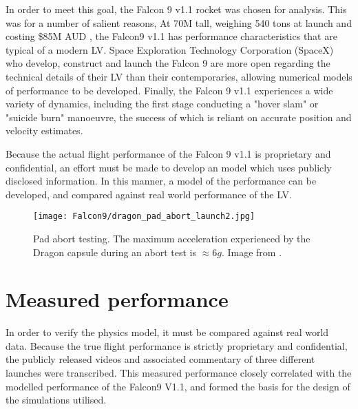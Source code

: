 In order to meet this goal, the Falcon 9 v1.1 rocket was chosen for analysis. This was for a number of salient reasons, At 70M tall, weighing 540 tons at launch and costing \$85M AUD \cite{SpaceXFalcon9}, the Falcon9 v1.1 has performance characteristics that are typical of a modern \ac{LV}. Space Exploration Technology Corporation (SpaceX) who develop, construct and launch the Falcon 9 are more open regarding the technical details of their \ac{LV} than their contemporaries, allowing numerical models of performance to be developed. Finally, the Falcon 9 v1.1 experiences a wide variety of dynamics, including the first stage conducting a "hover slam" or "suicide burn" manoeuvre, the success of which is reliant on accurate position and velocity estimates.

Because the actual flight performance of the Falcon 9 v1.1 is proprietary and confidential, an effort must be made to develop an model which uses publicly disclosed information. In this manner, a model of the performance can be developed, and compared against real world performance of the \ac{LV}.


\begin{figure}[!htb] 
    \centering
    \texttt{[image: Falcon9/dragon\_pad\_abort\_launch2.jpg]} 
    \caption{Pad abort testing. The maximum acceleration experienced by the Dragon capsule during an abort test is $\approx 6g$. Image from \cite{SpaceXPhotos}.}
    \label{fig:PadAbort}
\end{figure}

\section{Measured performance}

In order to verify the physics model, it must be compared against real world data. Because the true flight performance is strictly proprietary and confidential, the publicly released videos and associated commentary of three different launches were transcribed. This measured performance closely correlated with the modelled performance of the Falcon9 V1.1, and formed the basis for the design of the simulations utilised. 





